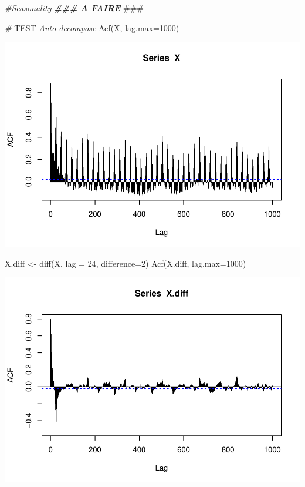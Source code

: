 \documentclass[
]{article}
\newenvironment{Shaded}{\begin{snugshade}}{\end{snugshade}}
\newcommand{\AlertTok}[1]{\textcolor[rgb]{0.94,0.16,0.16}{#1}}
\newcommand{\AttributeTok}[1]{\textcolor[rgb]{0.77,0.63,0.00}{#1}}
\newcommand{\CommentTok}[1]{\textcolor[rgb]{0.56,0.35,0.01}{\textit{#1}}}
\newcommand{\DecValTok}[1]{\textcolor[rgb]{0.00,0.00,0.81}{#1}}
\newcommand{\DocumentationTok}[1]{\textcolor[rgb]{0.56,0.35,0.01}{\textbf{\textit{#1}}}}
\newcommand{\FunctionTok}[1]{\textcolor[rgb]{0.00,0.00,0.00}{#1}}
\newcommand{\NormalTok}[1]{#1}
\newcommand{\OtherTok}[1]{\textcolor[rgb]{0.56,0.35,0.01}{#1}}
\begin{document}
\begin{Shaded}
\begin{Highlighting}[]
\CommentTok{\#Seasonality}
\DocumentationTok{\#\#\# A FAIRE }\AlertTok{\#\#\#}



\CommentTok{\# }\AlertTok{TEST}\CommentTok{ Auto decompose}
\FunctionTok{Acf}\NormalTok{(X, }\AttributeTok{lag.max=}\DecValTok{1000}\NormalTok{)}
\end{Highlighting}
\end{Shaded}

\includegraphics{STA202_report_files/figure-latex/unnamed-chunk-12-10.pdf}

\begin{Shaded}
\begin{Highlighting}[]
\NormalTok{X.diff }\OtherTok{\textless{}{-}} \FunctionTok{diff}\NormalTok{(X, }\AttributeTok{lag =} \DecValTok{24}\NormalTok{, }\AttributeTok{difference=}\DecValTok{2}\NormalTok{)}
\FunctionTok{Acf}\NormalTok{(X.diff, }\AttributeTok{lag.max=}\DecValTok{1000}\NormalTok{)}
\end{Highlighting}
\end{Shaded}

\includegraphics{STA202_report_files/figure-latex/unnamed-chunk-12-11.pdf}
\end{document}
